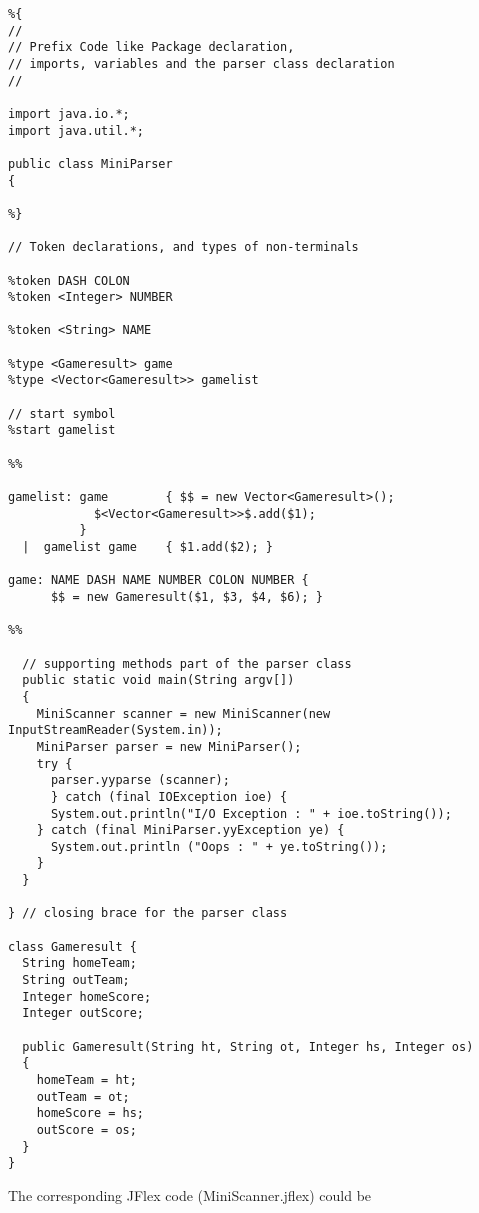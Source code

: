 \begin{verbatim}
%{
//
// Prefix Code like Package declaration, 
// imports, variables and the parser class declaration
// 

import java.io.*;
import java.util.*;

public class MiniParser 
{

%}

// Token declarations, and types of non-terminals

%token DASH COLON
%token <Integer> NUMBER

%token <String> NAME

%type <Gameresult> game
%type <Vector<Gameresult>> gamelist

// start symbol
%start gamelist

%%

gamelist: game        { $$ = new Vector<Gameresult>();
            $<Vector<Gameresult>>$.add($1);
          }
  |  gamelist game    { $1.add($2); }

game: NAME DASH NAME NUMBER COLON NUMBER {
      $$ = new Gameresult($1, $3, $4, $6); }

%%

  // supporting methods part of the parser class
  public static void main(String argv[])
  {
    MiniScanner scanner = new MiniScanner(new InputStreamReader(System.in));
    MiniParser parser = new MiniParser();
    try {
      parser.yyparse (scanner);
      } catch (final IOException ioe) {
      System.out.println("I/O Exception : " + ioe.toString());
    } catch (final MiniParser.yyException ye) {
      System.out.println ("Oops : " + ye.toString());
    }
  }

} // closing brace for the parser class

class Gameresult {
  String homeTeam;
  String outTeam;
  Integer homeScore;
  Integer outScore;

  public Gameresult(String ht, String ot, Integer hs, Integer os)
  {
    homeTeam = ht;
    outTeam = ot;
    homeScore = hs;
    outScore = os;
  }
}
\end{verbatim}

The corresponding JFlex code (MiniScanner.jflex) could be


